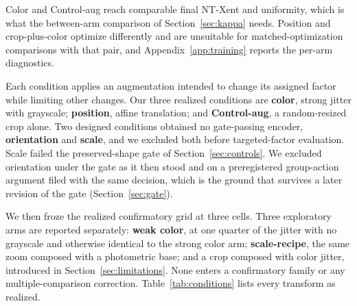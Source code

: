 \documentclass[10pt]{article}
\begin{document}
Color and Control-aug reach comparable final NT-Xent and uniformity, which is what the
between-arm comparison of Section~\ref{sec:kappa} needs. Position and crop-plus-color optimize
differently and are unsuitable for matched-optimization comparisons with that pair, and Appendix~\ref{app:training} reports the per-arm
diagnostics.


Each condition applies an augmentation intended to change its assigned factor while limiting other
changes. Our three realized conditions are \textbf{color}, strong jitter with grayscale;
\textbf{position}, affine translation; and \textbf{Control-aug}, a random-resized crop alone. Two
designed conditions obtained no gate-passing encoder, \textbf{orientation} and \textbf{scale}, and
we excluded both before targeted-factor evaluation. Scale failed the preserved-shape gate of
Section~\ref{sec:controls}. We excluded orientation under the gate as it then stood and on a
preregistered group-action argument filed with the same decision, which is the ground that survives
a later revision of the gate (Section~\ref{sec:gate}).

We then froze the realized confirmatory grid at three cells. Three exploratory arms are reported
separately: \textbf{weak color}, at one quarter of the jitter with no grayscale and otherwise
identical to the strong color arm; \textbf{scale-recipe}, the same zoom composed with a photometric
base; and a crop composed with color jitter, introduced in Section~\ref{sec:limitations}. None
enters a confirmatory family or any multiple-comparison correction. Table~\ref{tab:conditions} lists
every transform as realized.
\end{document}
